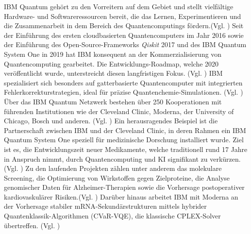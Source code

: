 IBM Quantum gehört zu den Vorreitern auf dem Gebiet und stellt vielfältige Hardware- und Softwareressourcen bereit, die das Lernen, Experimentieren und die Zusammenarbeit in dem Bereich des Quantencomputings fördern.(Vgl. \cite{abughanemIBMQuantumComputers2025}) 
Seit der Einführung des ersten cloudbasierten Quantencomputers im Jahr 2016 sowie der Einführung des Open-Source-Frameworks \textit{Qiskit} 2017 und des IBM Quantum System One in 2019 hat IBM konsequent an der Kommerzialisierung von Quantencomputing gearbeitet. Die Entwicklungs-Roadmap, welche 2020 veröffentlicht wurde, unterstreicht diesen langfristigen Fokus. (Vgl. \cite{jaygambettaIBMRoadmapQuantumcentric2022})
IBM spezialisiert sich besonders auf gatterbasierte Quantencomputer mit integrierten Fehlerkorrekturstrategien, ideal für präzise Quantenchemie-Simulationen. (Vgl. \cite{bravyiHighthresholdLowoverheadFaulttolerant2024, mullerImprovedBeliefPropagation2025})
Über das IBM Quantum Netzwerk bestehen über 250 Kooperationen mit führenden Institutionen wie der Cleveland Clinic, Moderna, der University of Chicago, Bosch und anderen. (Vgl. \cite{noauthor_ibm_nodate})
Ein herausragendes Beispiel ist die Partnerschaft zwischen IBM und der Cleveland Clinic, in deren Rahmen ein IBM Quantum System One speziell für medizinische Dorschung installiert wurde. Ziel ist es, die Entwicklungszeit neuer Medikamente, welche traditionell rund 17 Jahre in Anspruch nimmt, durch Quantencomputing und KI signifikant zu verkürzen.(Vgl. \cite{noauthor_cleveland_2025}) Zu den laufenden Projekten zählen unter anderem das molekulare Screening, die Optimierung von Wirkstoffen gegen Zielproteine, die Analyse genomischer Daten für Alzheimer-Therapien sowie die Vorhersage postoperativer kardiovaskulärer Risiken.(Vgl. \cite{flotherHowQuantumComputing2025}) Darüber hinaus arbeitet IBM mit Moderna an der Vorhersage stabiler mRNA-Sekundärstrukturen mittels hybrider Quantenklassik-Algorithmen (CVaR-VQE), die klassische CPLEX-Solver übertreffen. (Vgl. \cite{hou_lipid_2021})\\

